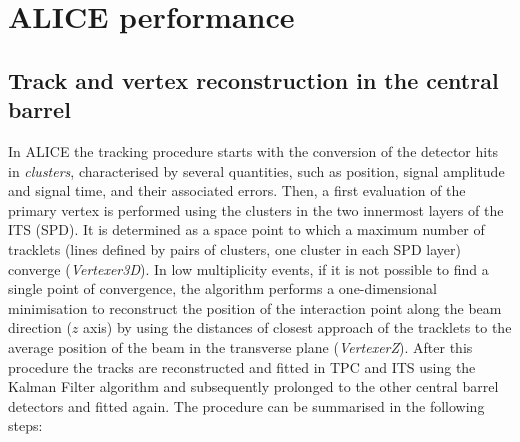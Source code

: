 \documentclass[b5paper,10pt,twoside,oldstyle,classica]{toptesi}
\begin{document}
\section{ALICE performance}
\subsection{Track and vertex reconstruction in the central barrel}
\label{vertex_reco_sec}
In ALICE the tracking procedure starts with the conversion of the detector hits in \textit{clusters}, characterised by several quantities, such as position, signal amplitude and signal time, and their associated errors. Then, a first evaluation of the primary vertex is performed using the clusters in the two innermost layers of the ITS (SPD). It is determined as a space point to which a maximum number of tracklets (lines defined by pairs of clusters, one cluster in each SPD layer) converge (\textit{Vertexer3D}). In low multiplicity events, if it is not possible to find a single point of convergence, the algorithm performs a one-dimensional minimisation to reconstruct the position of the interaction point along the beam direction ($z$ axis) by using the distances of closest approach of the tracklets to the average position of the beam in the transverse plane (\textit{VertexerZ}). After this procedure the tracks are reconstructed and fitted in TPC and ITS using the Kalman Filter algorithm \cite{Fruhwirth:1987fm} and subsequently prolonged to the other central barrel detectors and fitted again. The procedure can be summarised in the following steps: 
\end{document}
